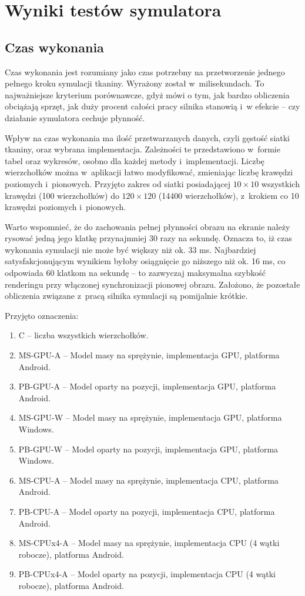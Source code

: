 \chapter{Wyniki testów symulatora}
\label{t:wyniki}

	\section{Czas wykonania}
	\label{t:wyniki:czas_wykonania}

		Czas wykonania jest rozumiany jako czas potrzebny na przetworzenie jednego pełnego kroku symulacji tkaniny. Wyrażony został w~milisekundach. To najważniejsze kryterium porównawcze, gdyż mówi o tym, jak bardzo obliczenia obciążają sprzęt, jak duży procent całości pracy silnika stanowią i~w efekcie -- czy działanie symulatora cechuje płynność. 
		
		Wpływ na czas wykonania ma ilość przetwarzanych danych, czyli gęstość siatki tkaniny, oraz wybrana implementacja. Zależności te przedstawiono w~formie tabel oraz wykresów, osobno dla każdej metody i~implementacji. Liczbę wierzchołków można w~aplikacji łatwo modyfikować, zmieniając liczbę krawędzi poziomych i~pionowych. Przyjęto zakres od siatki posiadającej \(10 \times 10 \) wszystkich krawędzi (100 wierzchołków) do \( 120 \times 120 \) (14400 wierzchołków), z~krokiem co 10 krawędzi poziomych i~pionowych.
		
		Warto wspomnieć, że do zachowania pełnej płynności obrazu na ekranie należy rysować jedną jego klatkę przynajmniej 30 razy na sekundę. Oznacza to, iż czas wykonania symulacji nie może być większy niż ok. 33 ms. Najbardziej satysfakcjonującym wynikiem byłoby osiągnięcie go niższego niż ok. 16 ms, co odpowiada 60 klatkom na sekundę -- to zazwyczaj maksymalna szybkość renderingu przy włączonej synchronizacji pionowej obrazu. Założono, że pozostałe obliczenia związane z~pracą silnika symulacji są pomijalnie krótkie.
		
		Przyjęto oznaczenia:
		
		\begin{enumerate}
			\item C -- liczba wszystkich wierzchołków.
			\item MS-GPU-A -- Model masy na sprężynie, implementacja GPU, platforma Android.
			\item PB-GPU-A -- Model oparty na pozycji, implementacja GPU, platforma Android.
			\item MS-GPU-W -- Model masy na sprężynie, implementacja GPU, platforma Windows.
			\item PB-GPU-W -- Model oparty na pozycji, implementacja GPU, platforma Windows.
			\item MS-CPU-A -- Model masy na sprężynie, implementacja CPU, platforma Android.
			\item PB-CPU-A -- Model oparty na pozycji, implementacja CPU, platforma Android.
			\item MS-CPUx4-A -- Model masy na sprężynie, implementacja CPU (4 wątki robocze), platforma Android.
			\item PB-CPUx4-A -- Model oparty na pozycji, implementacja CPU (4 wątki robocze), platforma Android.
		\end{enumerate}
		
